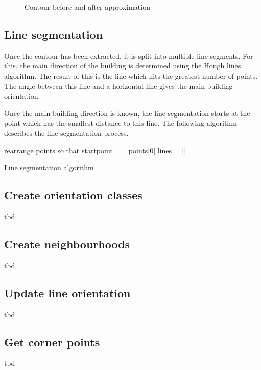 \begin{figure}[H]
\begin{subfigure}{0.4\textwidth}
	\end{subfigure}
	\caption{Contour before and after approximation}
	\label{fig:challenges:contour_approximation}
\end{figure}

\subsection{Line segmentation}
Once the contour has been extracted, it is split into multiple line segments. For this, the main direction of the building is determined using the Hough lines algorithm. The result of this is the line which hits the greatest number of points. The angle between this line and a horizontal line gives the main building orientation.

Once the main building direction is known, the line segmentation starts at the point which has the smallest distance to this line. The following algorithm describes the line segmentation process.

\begin{algorithm}[H]
rearrange points so that startpoint == points[0]
lines = []
\caption{Line segmentation algorithm}
\end{algorithm}

	
\subsection{Create orientation classes}
tbd

\subsection{Create neighbourhoods}
tbd

\subsection{Update line orientation}
tbd

\subsection{Get corner points}
tbd